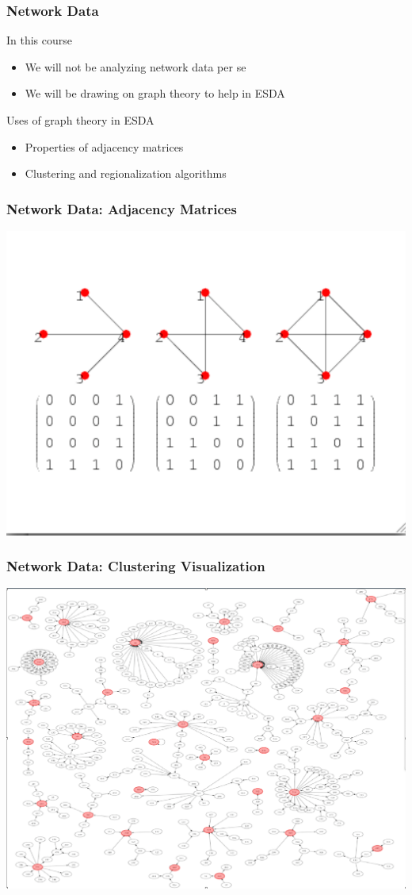 \documentclass[nototal]{beamer}
\begin{document}
\begin{frame}[<+->]
    \frametitle{Network Data}
	\begin{block}{In this course}
  \begin{itemize}
	    \item We will not be analyzing network data per se
	    \item We will be drawing on graph theory to help in ESDA
	  \end{itemize}
	\end{block}
	\begin{block}{Uses of graph theory in ESDA}
	  \begin{itemize}
	    \item Properties of adjacency matrices
	    \item Clustering and regionalization algorithms
	  \end{itemize}
	 \end{block}
  \end{frame}

\begin{frame}
    \frametitle{Network Data: Adjacency Matrices}
    \begin{center}
      \includegraphics[width=.65\linewidth]{AdjacencyMatrix.pdf}
    \end{center}
  \end{frame}


\begin{frame}
    \frametitle{Network Data: Clustering Visualization}
    \begin{center}
      \includegraphics[width=.65\linewidth]{clusternetwork.pdf}
    \end{center}
  \end{frame}
\end{document}
